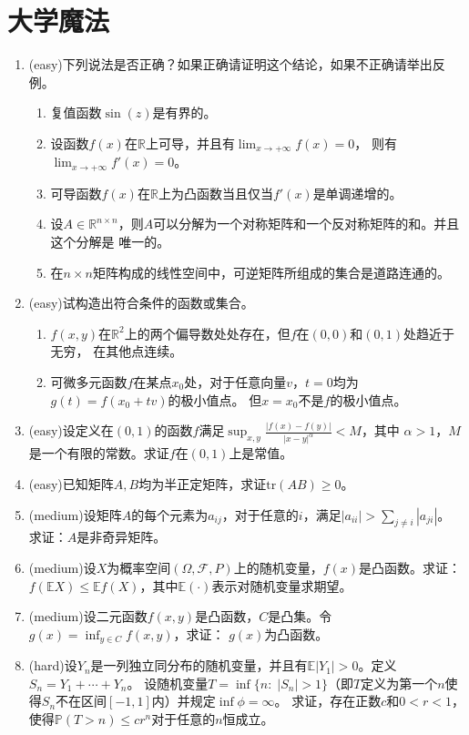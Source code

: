 \documentclass[a4paper]{article}
\begin{document}
\section{大学魔法}
\begin{enumerate}
\item (easy)下列说法是否正确？如果正确请证明这个结论，如果不正确请举出反例。
	\begin{enumerate}
	\item 复值函数$\sin(z)$是有界的。
	\item 设函数$f(x)$在$\mathbb{R}$上可导，并且有$\lim_{x\rightarrow +\infty}f(x)=0$，
	则有$\lim_{x\rightarrow +\infty}f'(x)=0$。
	\item 可导函数$f(x)$在$\mathbb{R}$上为凸函数当且仅当$f'(x)$是单调递增的。
	\item 设$A\in \mathbb{R}^{n\times n}$，则$A$可以分解为一个对称矩阵和一个反对称矩阵的和。并且这个分解是
	唯一的。
	\item 在$n\times n$矩阵构成的线性空间中，可逆矩阵所组成的集合是道路连通的。
	\end{enumerate}
\item (easy)试构造出符合条件的函数或集合。
	\begin{enumerate}
	\item $f(x,y)$在$\mathbb{R}^2$上的两个偏导数处处存在，但$f$在$(0,0)$和$(0,1)$处趋近于无穷，
	在其他点连续。
	\item 可微多元函数$f$在某点$x_0$处，对于任意向量$v$，$t=0$均为$g(t)=f(x_0+tv)$的极小值点。
	但$x=x_0$不是$f$的极小值点。
	\end{enumerate}

\item (easy)设定义在$(0,1)$的函数$f$满足$\sup_{x,y}\frac{|f(x)-f(y)|}{|x-y|^\alpha}<M$，其中
$\alpha>1$，$M$是一个有限的常数。求证$f$在$(0,1)$上是常值。
\item (easy)已知矩阵$A,B$均为半正定矩阵，求证$\mathrm{tr}(AB)\geqslant0$。
\item (medium)设矩阵$A$的每个元素为$a_{ij}$，对于任意的$i$，满足$|a_{ii}|>\sum_{j\neq i}{|a_{ji}|}$。
求证：$A$是非奇异矩阵。
\item (medium)设$X$为概率空间$(\Omega,\mathcal{F},P)$上的随机变量，$f(x)$是凸函数。求证：
$f(\mathbb{E}X)\leqslant \mathbb{E}f(X)$，其中$\mathbb{E}(\cdot)$表示对随机变量求期望。
\item (medium)设二元函数$f(x,y)$是凸函数，$C$是凸集。令$g(x)=\inf_{y\in C}f(x,y)$，求证：
$g(x)$为凸函数。
\item (hard)设$Y_n$是一列独立同分布的随机变量，并且有$\mathbb{E}|Y_1|>0$。定义$S_n=Y_1+\cdots+Y_n$。
设随机变量$T=\inf\{n:\; |S_n|>1 \}$（即$T$定义为第一个$n$使得$S_n$不在区间$[-1,1]$内）并规定$\inf\phi=\infty$。
求证，存在正数$c$和$0<r<1$，使得$\mathbb{P}(T>n)\leqslant cr^n$对于任意的$n$恒成立。
\end{enumerate}
\end{document}
